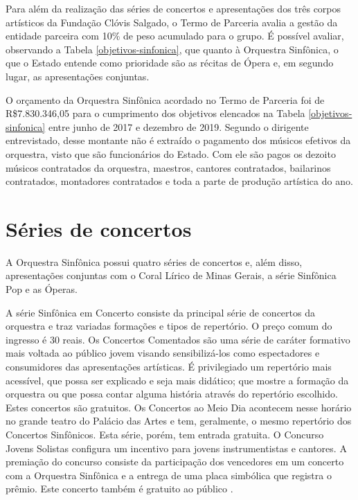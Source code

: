 \documentclass[a4paper, 12pt, openright, oneside, german, french, english, brazil]{abntex2}
\begin{document}
	Para além da realização das séries de concertos e apresentações dos três corpos artísticos da Fundação Clóvis Salgado, o Termo de Parceria avalia a gestão da entidade parceira com 10\% de peso acumulado para o grupo. É possível avaliar, observando  a Tabela \ref{objetivos-sinfonica}, que quanto à Orquestra Sinfônica, o que o Estado entende como prioridade são as récitas de Ópera e, em segundo lugar, as apresentações conjuntas.
	
	
	O orçamento da Orquestra Sinfônica acordado no Termo de Parceria foi de R\$7.830.346,05 para o cumprimento dos objetivos elencados na Tabela \ref{objetivos-sinfonica}\cite{appa2017parceria} entre junho de 2017 e dezembro de 2019. Segundo o dirigente entrevistado, desse montante não é extraído o pagamento dos músicos efetivos da orquestra, visto que são funcionários do Estado. Com ele são pagos os dezoito músicos contratados da orquestra, maestros, cantores contratados, bailarinos contratados, montadores contratados e toda a parte de produção artística do ano.  
	
	\section{Séries de concertos}
	
	A Orquestra Sinfônica possui quatro séries de concertos e, além disso, apresentações conjuntas com o Coral Lírico de Minas Gerais, a série Sinfônica Pop e as Óperas.
	
	A série Sinfônica em Concerto consiste da principal série de concertos da orquestra e traz variadas formações e tipos de repertório. O preço comum do ingresso é 30 reais. Os Concertos Comentados são uma série de caráter formativo mais voltada ao público jovem visando sensibilizá-los como espectadores e consumidores das apresentações artísticas. É privilegiado um repertório mais acessível, que possa ser explicado e seja mais didático; que mostre a formação da orquestra ou que possa contar alguma história através do repertório escolhido. Estes concertos são gratuitos. Os Concertos ao Meio Dia acontecem nesse horário no grande teatro do Palácio das Artes e tem, geralmente, o mesmo repertório dos Concertos Sinfônicos. Esta série, porém, tem entrada gratuita. O Concurso Jovens Solistas configura um incentivo para jovens instrumentistas e cantores. A premiação do concurso consiste da participação dos vencedores em um concerto com a Orquestra Sinfônica e a entrega de uma placa simbólica que registra o prêmio. Este concerto também é gratuito ao público \cite{appa2017parceria}.
	
\end{document}
